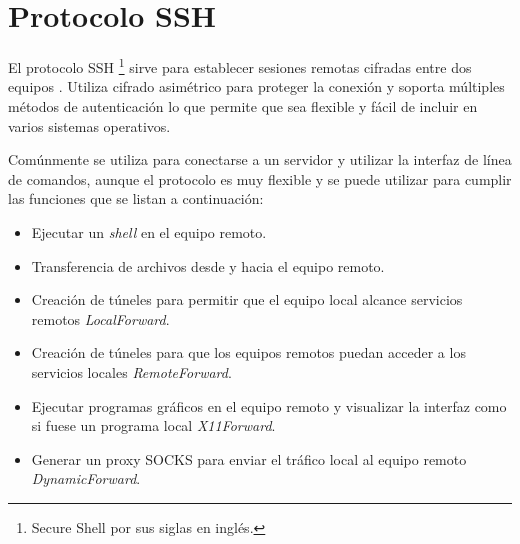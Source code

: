 \section {Protocolo SSH}
\label{Protocolo-SSH}
El protocolo \textsc{SSH} \footnote{Secure Shell por sus siglas en ingl\'{e}s.} sirve para establecer sesiones remotas cifradas entre dos equipos \cite{_ssh_????-1}. Utiliza cifrado asim\'{e}trico para proteger la conexi\'{o}n y soporta m\'{u}ltiples m\'{e}todos de autenticaci\'{o}n lo que permite que sea flexible y f\'{a}cil de incluir en varios sistemas operativos.

Com\'{u}nmente se utiliza para conectarse a un servidor y utilizar la interfaz de l\'{i}nea de comandos, aunque el protocolo es muy flexible y se puede utilizar para cumplir las funciones que se listan a continuaci\'{o}n:

  \begin{itemize}
    \item{Ejecutar un \textit{shell} en el equipo remoto.}
    \item{Transferencia de archivos desde y hacia el equipo remoto.}
    \item{Creaci\'{o}n de t\'{u}neles para permitir que el equipo local alcance servicios remotos \textit{LocalForward}.}
    \item{Creaci\'{o}n de t\'{u}neles para que los equipos remotos puedan acceder a los servicios locales \textit{RemoteForward}.}
    \item{Ejecutar programas gr\'{a}ficos en el equipo remoto y visualizar la interfaz como si fuese un programa local \textit{X11Forward}.}
    \item{Generar un proxy \textsc{SOCKS} para enviar el tr\'{a}fico local al equipo remoto \textit{DynamicForward}.}
  \end{itemize}

